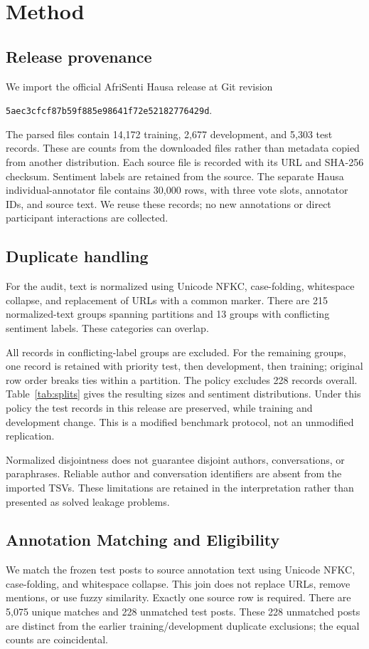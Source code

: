 \documentclass[conference]{IEEEtran}
\begin{document}
\section{Method}
\subsection{Release provenance}
We import the official AfriSenti Hausa release at Git revision
\begin{center}
\small\texttt{5aec3cfcf87b59f885e98641f72e52182776429d}.
\end{center}
The parsed files contain 14,172 training, 2,677 development, and 5,303 test
records. These are counts from the downloaded files rather than metadata
copied from another distribution. Each source file is recorded with its
URL and SHA-256 checksum. Sentiment labels are retained from the source.
The separate Hausa individual-annotator file contains 30,000 rows, with three
vote slots, annotator IDs, and source text. We reuse these records; no new
annotations or direct participant interactions are collected.

\subsection{Duplicate handling}
For the audit, text is normalized using Unicode NFKC, case-folding,
whitespace collapse, and replacement of URLs with a common marker.
There are 215 normalized-text groups spanning partitions and 13 groups
with conflicting sentiment labels. These categories can overlap.

All records in conflicting-label groups are excluded. For the remaining
groups, one record is retained with priority test, then development, then
training; original row order breaks ties within a partition.
The policy excludes 228 records overall. Table~\ref{tab:splits} gives the
resulting sizes and sentiment distributions. Under this policy the test
records in this release are preserved, while training and development change.
This is a modified benchmark protocol, not an unmodified replication.



Normalized disjointness does not guarantee disjoint authors, conversations,
or paraphrases. Reliable author and conversation identifiers are absent
from the imported TSVs. These limitations are retained in the interpretation
rather than presented as solved leakage problems.

\subsection{Annotation Matching and Eligibility}
We match the frozen test posts to source annotation text using Unicode NFKC,
case-folding, and whitespace collapse. This join does not replace URLs,
remove mentions, or use fuzzy similarity. Exactly one source row is required.
There are 5,075 unique matches and 228 unmatched test posts. These 228
unmatched posts are distinct from the earlier training/development duplicate
exclusions; the equal counts are coincidental.
\end{document}
